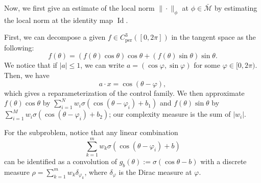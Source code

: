 \documentclass[12pt]{amsart}
\numberwithin{equation}{section}
\theoremstyle{remark}
\begin{document}
Now, we first give an estimate of the local norm $\|\cdot\|_\phi$ at $\phi\in \bar{\mathcal M}$ by estimating the local norm at the identity map $\operatorname{Id}$.

First, we can decompose a given $f\in C_{\text{per}}^3([0,2\pi])$ in the tangent space as the following:
\begin{equation}
    f(\theta)= (f(\theta) \cos\theta)\cos\theta + (f(\theta)\sin\theta)\sin\theta.
\end{equation}
We notice that if $|a|\le 1$, we can write $a =(\cos \varphi, \sin \varphi)$ for some $\varphi\in [0,2\pi)$. Then, we have
\begin{equation}
    a\cdot x = \cos(\theta-\varphi),
\end{equation}
which gives a reparameterization of the control family.
We then approximate $f(\theta)\cos\theta$ by $\sum_{i=1}^N w_i \sigma(\cos(\theta -\varphi_i)+b_1)$ and $f(\theta)\sin\theta$ by $\sum_{i=1}^M w_i \sigma(\cos(\theta -\varphi_i)+b_2)$; our complexity measure is the sum of $|w_i|$.

For the subproblem, notice that any linear combination
\begin{equation}
    \sum_{k=1}^m w_k\sigma(\cos(\theta -\varphi_i)+b)
\end{equation}
can be identified as a convolution of $g_b(\theta):=\sigma(\cos\theta - b)$ with a discrete measure $\rho = \sum_{k=1}^m w_k \delta_{\varphi_k}$, where $\delta_\varphi$ is the Dirac measure at $\varphi$.
\end{document}
